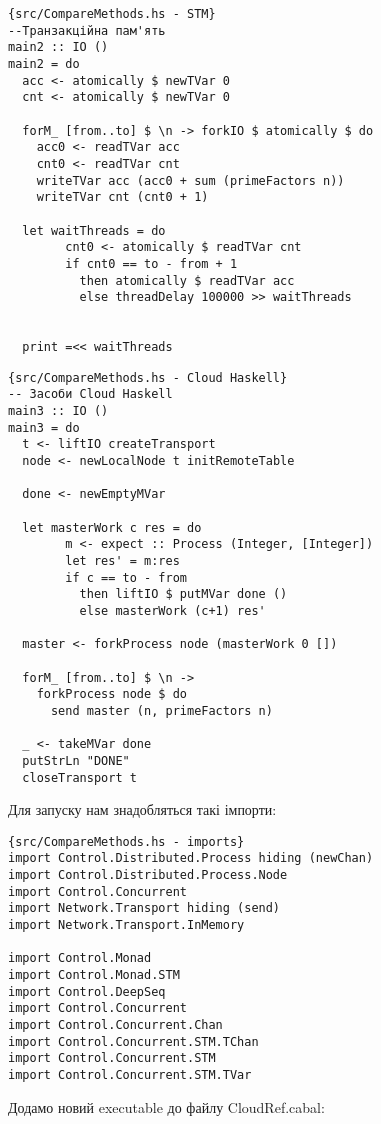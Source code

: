 \documentclass[12pt]{article}
\begin{document}
\begin{lstlisting}{src/CompareMethods.hs - STM}
--Транзакційна пам'ять
main2 :: IO ()
main2 = do
  acc <- atomically $ newTVar 0
  cnt <- atomically $ newTVar 0
  
  forM_ [from..to] $ \n -> forkIO $ atomically $ do
    acc0 <- readTVar acc
    cnt0 <- readTVar cnt
    writeTVar acc (acc0 + sum (primeFactors n))
    writeTVar cnt (cnt0 + 1)

  let waitThreads = do
        cnt0 <- atomically $ readTVar cnt
        if cnt0 == to - from + 1
          then atomically $ readTVar acc
          else threadDelay 100000 >> waitThreads
          
          
  print =<< waitThreads
\end{lstlisting}

\begin{lstlisting}{src/CompareMethods.hs - Cloud Haskell}
-- Засоби Cloud Haskell
main3 :: IO ()
main3 = do
  t <- liftIO createTransport
  node <- newLocalNode t initRemoteTable

  done <- newEmptyMVar
  
  let masterWork c res = do
        m <- expect :: Process (Integer, [Integer])
        let res' = m:res
        if c == to - from
          then liftIO $ putMVar done ()
          else masterWork (c+1) res'
      
  master <- forkProcess node (masterWork 0 [])
  
  forM_ [from..to] $ \n ->
    forkProcess node $ do
      send master (n, primeFactors n)

  _ <- takeMVar done
  putStrLn "DONE"
  closeTransport t
\end{lstlisting}

Для запуску нам знадобляться такі імпорти:

\begin{lstlisting}{src/CompareMethods.hs - imports}
import Control.Distributed.Process hiding (newChan)
import Control.Distributed.Process.Node 
import Control.Concurrent
import Network.Transport hiding (send)
import Network.Transport.InMemory

import Control.Monad
import Control.Monad.STM
import Control.DeepSeq
import Control.Concurrent
import Control.Concurrent.Chan
import Control.Concurrent.STM.TChan
import Control.Concurrent.STM
import Control.Concurrent.STM.TVar
\end{lstlisting}

Додамо новий executable до файлу CloudRef.cabal:
\end{document}
